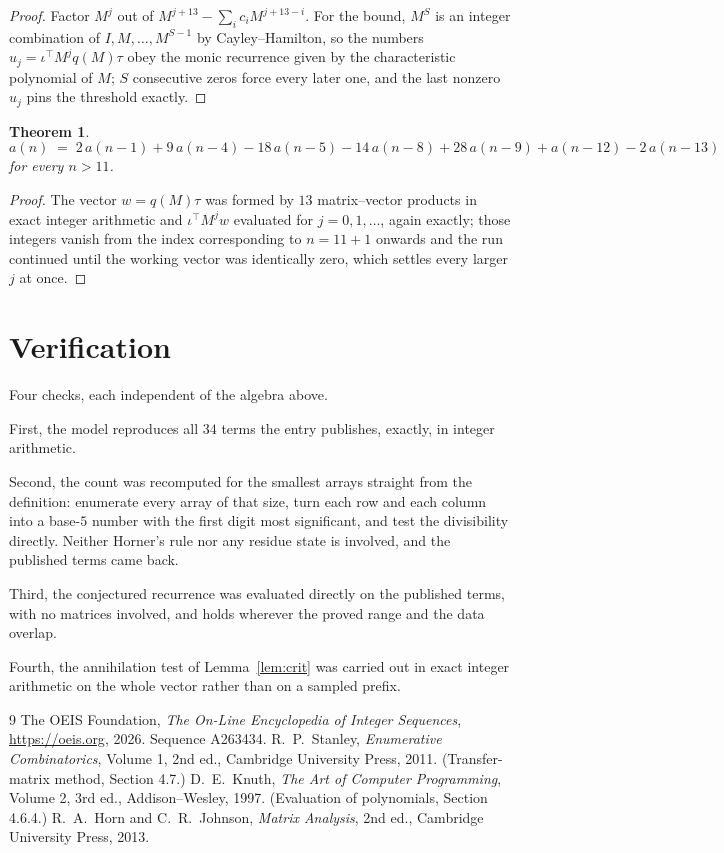 \documentclass[11pt,a4paper]{article}
\theoremstyle{plain}
\newtheorem{theorem}{Theorem}
\theoremstyle{definition}
\begin{document}
\begin{proof}
Factor $M^{j}$ out of $M^{j+13}-\sum_ic_iM^{j+13-i}$. For the bound, $M^{S}$
is an integer combination of $I,M,\dots,M^{S-1}$ by Cayley--Hamilton, so the numbers
$u_j=\iota^{\!\top}M^{j}q(M)\tau$ obey the monic recurrence given by the characteristic
polynomial of $M$; $S$ consecutive zeros force every later one, and the last nonzero $u_j$
pins the threshold exactly.
\end{proof}

\begin{theorem}
\[
a(n)\;=\;2\,a(n-1) + 9\,a(n-4) - 18\,a(n-5) - 14\,a(n-8) + 28\,a(n-9) + a(n-12) - 2\,a(n-13)
\]
for every $n>11$.
\end{theorem}

\begin{proof}
The vector $w=q(M)\tau$ was formed by $13$ matrix--vector products in exact integer
arithmetic and $\iota^{\!\top}M^{j}w$ evaluated for $j=0,1,\dots$, again exactly; those
integers vanish from the index corresponding to $n=11+1$ onwards and the run continued
until the working vector was identically zero, which settles every larger $j$ at once.
\end{proof}

\section{Verification}

Four checks, each independent of the algebra above.

First, the model reproduces all $34$ terms the entry publishes, exactly, in integer
arithmetic.

Second, the count was recomputed for the smallest arrays straight from the definition:
enumerate every array of that size, turn each row and each column into a base-$5$ number with
the first digit most significant, and test the divisibility directly. Neither Horner's rule nor
any residue state is involved, and the published terms came back.

Third, the conjectured recurrence was evaluated directly on the published terms, with no
matrices involved, and holds wherever the proved range and the data overlap.

Fourth, the annihilation test of Lemma~\ref{lem:crit} was carried out in exact integer
arithmetic on the whole vector rather than on a sampled prefix.

\begin{thebibliography}{9}
 The OEIS Foundation, \emph{The On-Line Encyclopedia of Integer
Sequences}, \url{https://oeis.org}, 2026. Sequence A263434.
 R.~P.~Stanley, \emph{Enumerative Combinatorics}, Volume 1, 2nd ed.,
Cambridge University Press, 2011. (Transfer-matrix method, Section 4.7.)
 D.~E.~Knuth, \emph{The Art of Computer Programming}, Volume 2, 3rd ed.,
Addison--Wesley, 1997. (Evaluation of polynomials, Section 4.6.4.)
 R.~A.~Horn and C.~R.~Johnson, \emph{Matrix Analysis}, 2nd ed., Cambridge
University Press, 2013.
\end{thebibliography}
\end{document}
